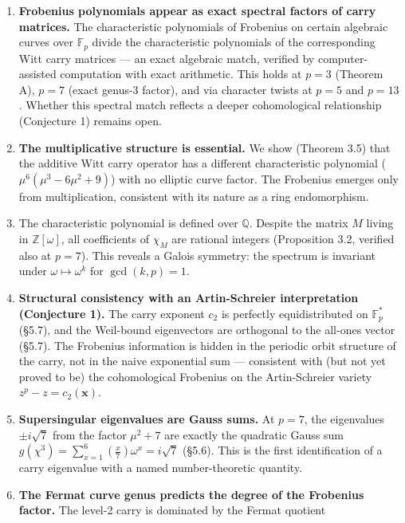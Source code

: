 \documentclass[
  11pt,
]{article}
\begin{document}
\begin{enumerate}
\def\labelenumi{\arabic{enumi}.}
\item
  \textbf{Frobenius polynomials appear as exact spectral factors of carry
  matrices.} The characteristic polynomials of Frobenius on certain algebraic
  curves over \(\mathbb{F}_p\) divide the characteristic polynomials of the
  corresponding Witt carry matrices --- an exact algebraic match, verified by
  computer-assisted computation with exact arithmetic. This holds at \(p = 3\)
  (Theorem A), \(p = 7\) (exact genus-3 factor), and via character twists at
  \(p = 5\) and \(p = 13\). Whether this spectral match reflects a deeper
  cohomological relationship (Conjecture 1) remains open.
\item
  \textbf{The multiplicative structure is essential.} We show (Theorem 3.5) that
  the additive Witt carry operator has a different characteristic polynomial
  (\(\mu^6(\mu^3 - 6\mu^2 + 9)\)) with no elliptic curve factor. The Frobenius
  emerges only from multiplication, consistent with its nature as a ring
  endomorphism.
\item
  The characteristic polynomial is defined over \(\mathbb{Q}\). Despite the
  matrix \(M\) living in \(\mathbb{Z}[\omega]\), all coefficients of \(\chi_M\)
  are rational integers (Proposition 3.2, verified also at \(p = 7\)). This
  reveals a Galois symmetry: the spectrum is invariant under
  \(\omega \mapsto \omega^k\) for \(\gcd(k, p) = 1\).
\item
  \textbf{Structural consistency with an Artin-Schreier interpretation
  (Conjecture 1).} The carry exponent \(c_2\) is perfectly equidistributed on
  \(\mathbb{F}_p^{\ast}\) (§5.7), and the Weil-bound eigenvectors are orthogonal
  to the all-ones vector (§5.7). The Frobenius information is hidden in the
  periodic orbit structure of the carry, not in the naive exponential sum ---
  consistent with (but not yet proved to be) the cohomological Frobenius on the
  Artin-Schreier variety \(z^p - z = c_2(\boldsymbol{x})\).
\item
  \textbf{Supersingular eigenvalues are Gauss sums.} At \(p = 7\), the
  eigenvalues \(\pm i\sqrt{7}\) from the factor \(\mu^2 + 7\) are exactly the
  quadratic Gauss sum
  \(g(\chi^3) = \sum_{x=1}^{6} \left(\frac{x}{7}\right) \omega^x = i\sqrt{7}\)
  (§5.6). This is the first identification of a carry eigenvalue with a named
  number-theoretic quantity.
\item
  \textbf{The Fermat curve genus predicts the degree of the Frobenius factor.}
  The level-2 carry is dominated by the Fermat quotient

\end{enumerate}
\end{document}
